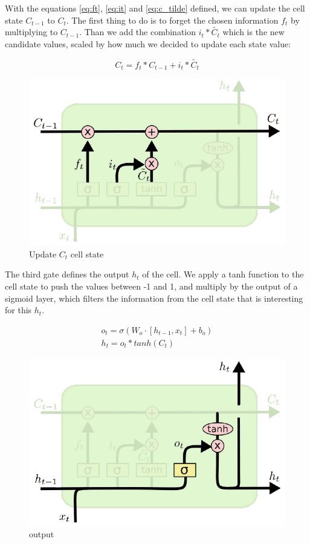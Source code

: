 \documentclass[12pt]{report}
\begin{document}
With the equations \ref{eq:ft}, \ref{eq:it} and \ref{eq:c_tilde} defined, we can update the cell state $C_{t-1}$ to $C_t$. The first thing to do is to forget the chosen information $f_t$ by multiplying to $C_{t-1}$. Than we add the combination $i_t * \tilde{C_t}$ which is the new candidate values, scaled by how much we decided to update each state value:

\begin{equation}
C_t = f_t \ast C_{t-1} + i_t \ast \tilde{C_t} 
\label{eq:ct}
\end{equation}

\begin{figure}[!ht]
\centering
\includegraphics[scale=0.5]{lstm5.pdf}
\caption{Update $C_t$ cell state}
\label{fig:lstm5}
\end{figure}

The third gate defines the output $h_t$ of the cell. We apply a tanh function to the cell state to push the values between -1 and 1, and multiply by the output of a sigmoid layer, which filters the information from the cell state that is interesting for this $h_t$.

\begin{gather}
o_t = \sigma(W_o \cdot [h_{t-1}, x_t] + b_o) \label{eq:ot}\\
h_t = o_t \ast tanh(C_t) \label{eq:ht}
\end{gather}

\begin{figure}[!ht]
\centering
\includegraphics[scale=0.5]{lstm6.pdf}
\caption{output}
\label{fig:lstm6}
\end{figure}
\end{document}
